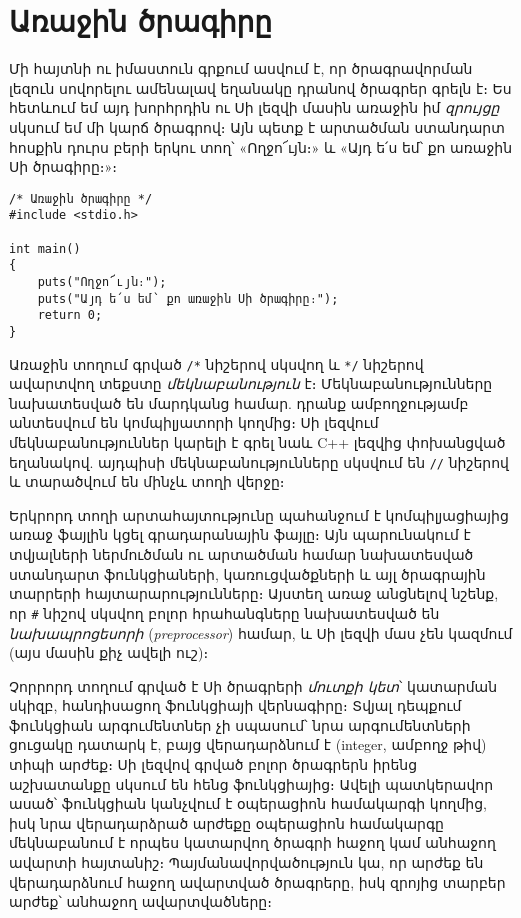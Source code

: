 \chapter{Առաջին ծրագիրը}


Մի հայտնի ու իմաստուն գրքում \cite{krc} ասվում է, որ ծրագրավորման
լեզուն սովորելու ամենալավ եղանակը դրանով ծրագրեր գրելն է։ Ես հետևում
եմ այդ խորհրդին ու Սի լեզվի մասին առաջին իմ \emph{զրույցը} սկսում
եմ մի կարճ ծրագրով։ Այն պետք է արտածման ստանդարտ հոսքին դուրս բերի
երկու տող՝ «Ողջո՜ւյն։» և «Այդ ե՛ս եմ՝ քո առաջին Սի ծրագիրը։»։

\begin{Verbatim}
/* Առաջին ծրագիրը */
#include <stdio.h>

int main()
{
    puts("Ողջո՜ւյն։");
    puts("Այդ ե՛ս եմ՝ քո առաջին Սի ծրագիրը։");
    return 0;
}
\end{Verbatim}

Առաջին տողում գրված \Verb|/*| նիշերով սկսվող և \Verb|*/| նիշերով
ավարտվող տեքստը \emph{մեկնաբանություն} է։
Մեկնաբանությունները նախատեսված են մարդկանց հա\-մար. դրանք
ամբողջությամբ անտեսվում են կոմպիլյատորի կողմից։ Սի լեզվում
մեկնաբանություններ կարելի է գրել նաև C++ լեզվից փոխանցված եղանակով.
այդպիսի մեկնաբանությունները սկսվում են \Verb|//| նիշերով և տարածվում
են մինչև տողի վերջը։

Երկրորդ տողի  արտահայտությունը պահանջում
է կոմ\-պիլյացիայից առաջ  ֆայլին կցել գրադարանային
 ֆայլը։ Այն պարունակում է տվյալների ներմուծման ու
արտածման համար նախատես\-ված ստանդարտ ֆունկցիաների, կառուցվածքների և
այլ ծրագրային տարրերի հայտարարությունները։ Այստեղ առաջ անցնելով
նշենք, որ \Verb|#| նիշով սկսվող բոլոր հրահանգները նախատեսված են
\emph{նախապրոցեսորի} (\emph{preprocessor}) համար,
և Սի լեզվի մաս չեն կազմում (այս մասին քիչ ավելի ուշ)։

Չորրորդ տողում գրված է Սի ծրագրերի \emph{մուտքի կետ}՝ կատարման
սկիզբ, հանդիսացող  ֆունկցիայի վերնագիրը։
Տվյալ դեպքում  ֆունկցիան արգումենտներ չի սպասում՝ նրա
արգումենտների ցուցակը դատարկ է, բայց վերադարձնում է 
(integer, ամբողջ թիվ) տիպի արժեք։ Սի լեզվով գրված բոլոր ծրագրերն
իրենց աշխատանքը սկսում են հենց  ֆունկցիայից։ Ավելի
պատկերավոր ասած՝  ֆունկցիան կանչվում է օպերացիոն
համակարգի կողմից, իսկ նրա վերադարձրած արժեքը օպերացիոն համակարգը
մեկնաբա\-նում է որպես կատարվող ծրագրի հաջող կամ անհաջող ավարտի
հայտանիշ։ Պայ\-մանավորվածություն կա, որ  արժեք են
վերադարձնում հաջող ավարտված ծրագրերը, իսկ զրոյից տարբեր արժեք՝
անհաջող ավարտվածները։

